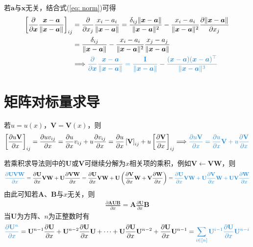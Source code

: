 \documentclass{ctexart}
\newcommand{\blue}[1]{\textcolor{Solarized-blue}{#1}}
\theoremstyle{definition}
\def \av {\bm{a}}
\def \xv {\bm{x}}
\def \Av {\mathbf{A}}
\def \Bv {\mathbf{B}}
\def \Iv {\mathbf{I}}
\def \Uv {\mathbf{U}}
\def \Vv {\mathbf{V}}
\def \Wv {\mathbf{W}}
\begin{document}
若$\av$与$\xv$无关，结合式(\ref{eq: norm})可得
\begin{align*}
    \left[ \frac{\partial}{\partial \xv} \frac{\xv - \av}{\| \xv - \av \|} \right]_{ij} & = \frac{\partial}{\partial x_j} \frac{x_i - a_i}{\| \xv - \av \|} = \frac{\delta_{ij} \|\xv - \av\|}{\| \xv - \av \|^2} - \frac{x_i - a_i}{\| \xv - \av \|^2} \frac{\partial \| \xv - \av \|}{\partial x_j} \\
                                                                                        & = \frac{\delta_{ij}}{\| \xv - \av \|} - \frac{x_i - a_i}{\| \xv - \av \|^2} \frac{x_j - a_j}{\| \xv - \av \|}                                                                                               \\
                                                                                        & \Longrightarrow \blue{\frac{\partial}{\partial \xv} \frac{\xv - \av}{\| \xv - \av \|} = \frac{\Iv}{\| \xv - \av \|} - \frac{(\xv - \av)(\xv - \av)^\top}{\| \xv - \av \|^3}}
\end{align*}


\section{矩阵对标量求导}

若$u = u(x)$，$\Vv = \Vv(x)$，则
\begin{align*}
    \left[ \frac{\partial u \Vv}{\partial x} \right]_{ij} = \frac{\partial u v_{ij}}{\partial x} = \frac{\partial u}{\partial x} v_{ij} + u \frac{\partial v_{ij}}{\partial x} = \frac{\partial u}{\partial x} \left[ \Vv \right]_{ij} + u \left[ \frac{\partial \Vv}{\partial x} \right]_{ij} \Longrightarrow \blue{\frac{\partial u \Vv}{\partial x} = \frac{\partial u}{\partial x} \Vv + u \frac{\partial \Vv}{\partial x}}
\end{align*}

若乘积求导法则中的$\Uv$或$\Vv$可继续分解为$x$相关项的乘积，例如$\Vv \leftarrow \Vv \Wv$，则
\begin{align} \label{eq: product}
    \blue{\frac{\partial \Uv \Vv \Wv}{\partial x}} = \frac{\partial \Uv}{\partial x} \Vv \Wv + \Uv \frac{\partial \Vv \Wv}{\partial x} = \frac{\partial \Uv}{\partial x} \Vv \Wv + \Uv \left( \frac{\partial \Vv}{\partial x} \Wv + \Vv \frac{\partial \Wv}{\partial x} \right) = \blue{\frac{\partial \Uv}{\partial x} \Vv \Wv + \Uv \frac{\partial \Vv}{\partial x} \Wv + \Uv \Vv \frac{\partial \Wv}{\partial x}}
\end{align}
由此可知若$\Av$、$\Bv$与$x$无关，则
\begin{align*}
    \frac{\partial \Av \Uv \Bv}{\partial x} = \Av \frac{\partial \Uv}{\partial x} \Bv
\end{align*}
当$\Uv$为方阵、$n$为正整数时有
\begin{align} \label{eq: power}
    \blue{\frac{\partial \Uv^n}{\partial x}} = \Uv^{n-1} \frac{\partial \Uv}{\partial x} + \Uv^{n-2} \frac{\partial \Uv}{\partial x} \Uv + \cdots + \Uv \frac{\partial \Uv}{\partial x} \Uv^{n-2} + \frac{\partial \Uv}{\partial x} \Uv^{n-1} = \blue{\sum_{i \in [n]} \Uv^{i-1} \frac{\partial \Uv}{\partial x} \Uv^{n-i}}
\end{align}
\end{document}
